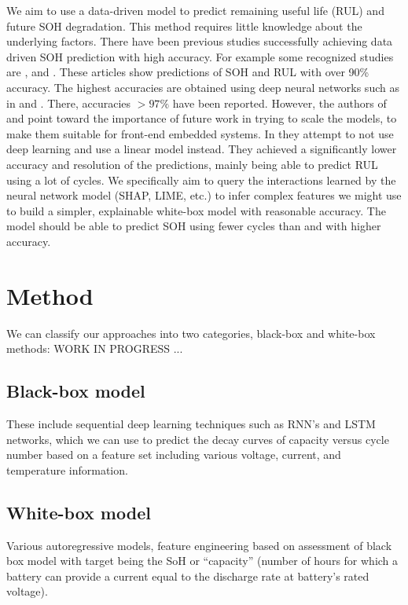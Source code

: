 We aim to use a data-driven model to predict remaining useful life (RUL) and future SOH degradation. This method requires little knowledge about the underlying factors. There have been previous studies successfully achieving data driven SOH prediction with high accuracy. For example some recognized studies are \cite{severson2019data}, \cite{roman2021machine} and \cite{energiesMdpi}. These articles show predictions of SOH and RUL with over 90\% accuracy. The highest accuracies are obtained using deep neural networks such as in \cite{roman2021machine} and \cite{energiesMdpi}. There, accuracies $>97\%$ have been reported. However, the authors of \cite{energiesMdpi} and \cite{DariusOld} point toward the importance of future work in trying to scale the models, to make them suitable for front-end embedded systems. In \cite{severson2019data} they attempt to not use deep learning and use a linear model instead. They achieved a significantly lower accuracy and resolution of the predictions, mainly being able to predict RUL using a lot of cycles. We specifically aim to query the interactions learned by the neural network model (SHAP, LIME, etc.) to infer complex features we might use to build a simpler, explainable white-box model with reasonable accuracy. The model should be able to predict SOH using fewer cycles than \cite{severson2019data} and with higher accuracy.


\section{Method}
We can classify our approaches into two categories, black-box and white-box methods: WORK IN PROGRESS ...

\subsection{Black-box model}
These include sequential deep learning techniques such as RNN's and LSTM networks, which we can use to predict the decay curves of capacity versus cycle number based on a feature set including various voltage, current, and temperature information. 

\subsection{White-box model}
Various autoregressive models, feature engineering based on assessment of black box model with target being the SoH or “capacity” (number of hours for which a battery can provide a current equal to the discharge rate at battery’s rated voltage).

